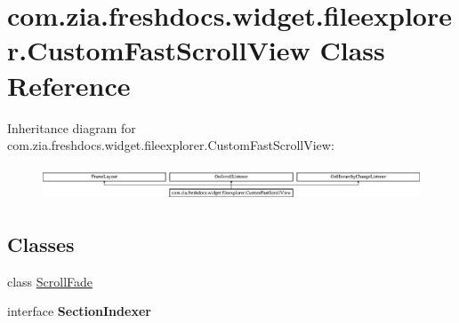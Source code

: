 \hypertarget{classcom_1_1zia_1_1freshdocs_1_1widget_1_1fileexplorer_1_1_custom_fast_scroll_view}{\section{com.\-zia.\-freshdocs.\-widget.\-fileexplorer.\-Custom\-Fast\-Scroll\-View Class Reference}
\label{classcom_1_1zia_1_1freshdocs_1_1widget_1_1fileexplorer_1_1_custom_fast_scroll_view}
}
Inheritance diagram for com.\-zia.\-freshdocs.\-widget.\-fileexplorer.\-Custom\-Fast\-Scroll\-View\-:\begin{figure}[H]
\begin{center}
\leavevmode
\includegraphics[height=1.034164cm]{classcom_1_1zia_1_1freshdocs_1_1widget_1_1fileexplorer_1_1_custom_fast_scroll_view}
\end{center}
\end{figure}
\subsection*{Classes}
\begin{DoxyCompactItemize}
\item 
class \hyperlink{classcom_1_1zia_1_1freshdocs_1_1widget_1_1fileexplorer_1_1_custom_fast_scroll_view_1_1_scroll_fade}{Scroll\-Fade}
\item 
interface {\bfseries Section\-Indexer}
\end{DoxyCompactItemize}
